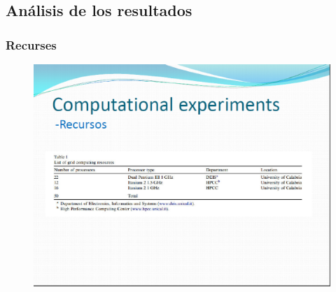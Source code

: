 \documentclass{beamer}
\begin{document}
\subsection{Análisis de los resultados}
\begin{frame}
\frametitle{Recurses }
\begin{figure}[!th]
\begin{center}
\includegraphics[width=1\textwidth]{img/pic13.eps}
\end{center}
\end{figure}
\end{frame}
\end{document}
